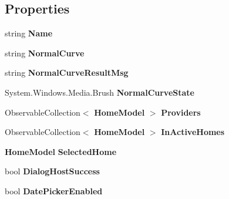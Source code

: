 \subsection*{Properties}
\begin{DoxyCompactItemize}
\item 
\mbox{\label{class_a_f_h___scheduler_1_1_data_v_m_a3779cef001e75655aec9520fdb897163}} 
string {\bfseries Name}\hspace{0.3cm}{\ttfamily  [get]}
\item 
\mbox{\label{class_a_f_h___scheduler_1_1_data_v_m_a4779bb0b8e757b5cc8695d5eb6b03338}} 
string {\bfseries Normal\+Curve}\hspace{0.3cm}{\ttfamily  [get, set]}
\item 
\mbox{\label{class_a_f_h___scheduler_1_1_data_v_m_a89e435b3202cd756eb69ae4dbb6be473}} 
string {\bfseries Normal\+Curve\+Result\+Msg}\hspace{0.3cm}{\ttfamily  [get, set]}
\item 
\mbox{\label{class_a_f_h___scheduler_1_1_data_v_m_aabc3011fedbfb15348c3bb72ce3d899c}} 
System.\+Windows.\+Media.\+Brush {\bfseries Normal\+Curve\+State}\hspace{0.3cm}{\ttfamily  [get, set]}
\item 
\mbox{\label{class_a_f_h___scheduler_1_1_data_v_m_a8978742511cece6e5154ff14fb0d4f6f}} 
Observable\+Collection$<$ \textbf{ Home\+Model} $>$ {\bfseries Providers}\hspace{0.3cm}{\ttfamily  [get, set]}
\item 
\mbox{\label{class_a_f_h___scheduler_1_1_data_v_m_aa70a9e0441f72cafe1b0c9db19afbd0e}} 
Observable\+Collection$<$ \textbf{ Home\+Model} $>$ {\bfseries In\+Active\+Homes}\hspace{0.3cm}{\ttfamily  [get, set]}
\item 
\mbox{\label{class_a_f_h___scheduler_1_1_data_v_m_a0d820632d3566a3e733c677de0c7bd29}} 
\textbf{ Home\+Model} {\bfseries Selected\+Home}\hspace{0.3cm}{\ttfamily  [get, set]}
\item 
\mbox{\label{class_a_f_h___scheduler_1_1_data_v_m_a50c6cdae5203b9824d25544ee0d5c585}} 
bool {\bfseries Dialog\+Host\+Success}\hspace{0.3cm}{\ttfamily  [get, set]}
\item 
\mbox{\label{class_a_f_h___scheduler_1_1_data_v_m_accf36bdb4aa906c1e481dcd7f4ae2253}} 
bool {\bfseries Date\+Picker\+Enabled}\hspace{0.3cm}{\ttfamily  [get, set]}
\item 

\end{DoxyCompactItemize}
